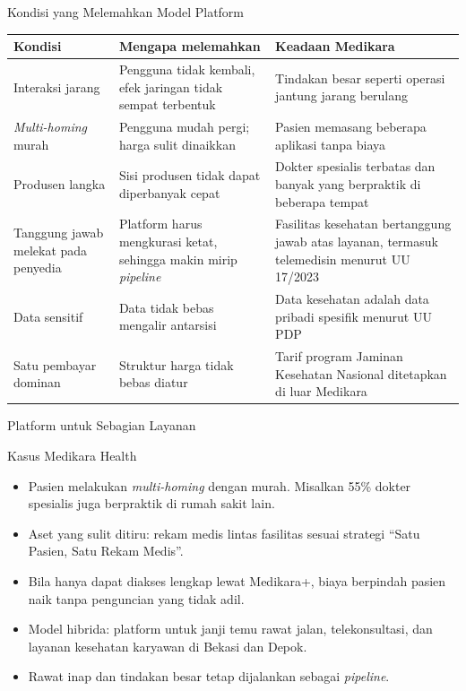 \documentclass[aspectratio=169, table, 12pt]{beamer}
\begin{document}
\begin{frame}{{\Large Kondisi yang Melemahkan Model Platform}}
  \scriptsize
  \begin{tabularx}{\textwidth}{>{\raggedright\arraybackslash}p{3.0cm}
      >{\raggedright\arraybackslash}X
      >{\raggedright\arraybackslash}X}
    \hline
    \textbf{Kondisi} & \textbf{Mengapa melemahkan} & \textbf{Keadaan Medikara} \\ \hline
    Interaksi jarang & Pengguna tidak kembali, efek jaringan tidak sempat terbentuk & Tindakan besar seperti operasi jantung jarang berulang \\ \hline
    \textit{Multi-homing} murah & Pengguna mudah pergi; harga sulit dinaikkan & Pasien memasang beberapa aplikasi tanpa biaya \\ \hline
    Produsen langka & Sisi produsen tidak dapat diperbanyak cepat & Dokter spesialis terbatas dan banyak yang berpraktik di beberapa tempat \\ \hline
    Tanggung jawab melekat pada penyedia & Platform harus mengkurasi ketat, sehingga makin mirip \textit{pipeline} & Fasilitas kesehatan bertanggung jawab atas layanan, termasuk telemedisin menurut UU 17/2023 \\ \hline
    Data sensitif & Data tidak bebas mengalir antarsisi & Data kesehatan adalah data pribadi spesifik menurut UU PDP \\ \hline
    Satu pembayar dominan & Struktur harga tidak bebas diatur & Tarif program Jaminan Kesehatan Nasional ditetapkan di luar Medikara \\ \hline
  \end{tabularx}
\end{frame}

\begin{frame}{{\Large Platform untuk Sebagian Layanan}}
  \begin{block}{Kasus Medikara Health}
    \small
    \begin{itemize}
      \item Pasien melakukan \textit{multi-homing} dengan murah. Misalkan 55\% dokter spesialis juga berpraktik di rumah sakit lain.
      \item Aset yang sulit ditiru: rekam medis lintas fasilitas sesuai strategi ``Satu Pasien, Satu Rekam Medis''.
      \item Bila hanya dapat diakses lengkap lewat Medikara+, biaya berpindah pasien naik tanpa penguncian yang tidak adil.
      \item Model hibrida: platform untuk janji temu rawat jalan, telekonsultasi, dan layanan kesehatan karyawan di Bekasi dan Depok.
      \item Rawat inap dan tindakan besar tetap dijalankan sebagai \textit{pipeline}.
    \end{itemize}
  \end{block}
\end{frame}
\end{document}
